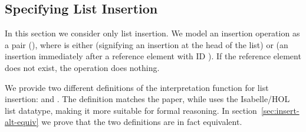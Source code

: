 \subsection{Specifying List Insertion}

In this section we consider only list insertion.
We model an insertion operation as a pair (), where  is either  (signifying an insertion at the head of the list) or  (an insertion immediately after a reference element with ID ).
If the reference element does not exist, the operation does nothing.

We provide two different definitions of the interpretation function for list insertion:  and .
The  definition matches the paper, while  uses the Isabelle/HOL list datatype, making it more suitable for formal reasoning.
In section~\ref{sec:insert-alt-equiv} we prove that the two definitions are in fact equivalent.

